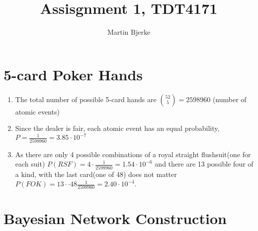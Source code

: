 \documentclass[12pt, letterpaper]{article}
\title{Assisgnment 1, TDT4171}
\author{Martin Bjerke}
\begin{document}
\maketitle


\section{5-card Poker Hands}

\begin{enumerate}[label=(\alph*)]
  \item The total number of possible 5-card hands are $\binom{52}{5} = 2598960$
    (number of atomic events)
  \item Since the dealer is fair, each atomic event has an equal probability, $P
    = \frac{1}{2598960} = 3.85 \cdot 10^{-7} $
  \item As there are only 4 possible combinations of a royal straight flushsuit(one
    for each suit) $P(RSF) = 4 \cdot \frac{1}{2598960} = 1.54 \cdot 10^{-6} $
    and there are 13 possible four of a kind, with the last card(one of 48) does
    not matter $P(FOK) = 13 \cdot \cdot 48 \frac{1}{2598960} = 2.40 \cdot 10^{-4} $.
\end{enumerate}

\section{Bayesian Network Construction}
\end{document}
